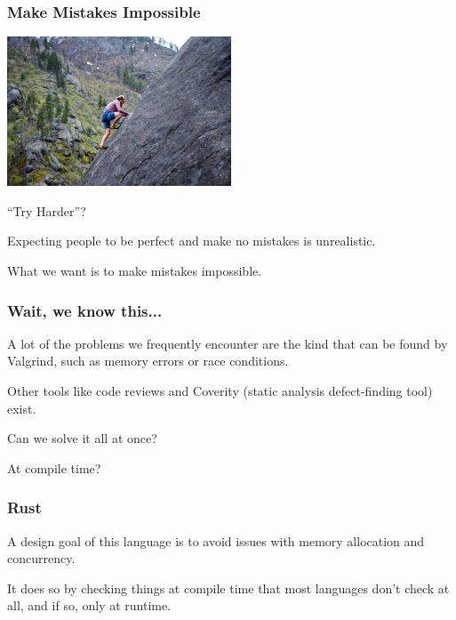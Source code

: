 \begin{frame}
\frametitle{Make Mistakes Impossible}

\begin{center}
	\includegraphics[width=0.5\textwidth]{images/try-harder.jpeg}
\end{center}
``Try Harder''?

 Expecting people to be perfect and make no mistakes is unrealistic.
 
  What we want is to make mistakes impossible.


\end{frame}


\begin{frame}
\frametitle{Wait, we know this...}

A lot of the problems we frequently encounter are the kind that can be found by Valgrind, such as memory errors or race conditions.

Other tools like code reviews and Coverity (static analysis defect-finding tool) exist.

Can we solve it all at once?

At compile time?

\end{frame}



\begin{frame}
\frametitle{Rust}

A design goal of this language is to avoid issues with memory allocation and concurrency. 


It does so by checking things at compile time that most languages don't check at all, and if so, only at runtime.

\end{frame}





